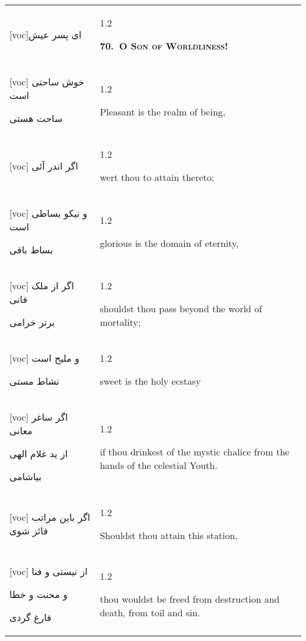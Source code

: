 \documentclass[11pt]{article}
\makeatletter
\newenvironment{orig}
  {\begin{farsi}[voc]}
  {\end{farsi}}
\newenvironment{trans}
  {\Large\begin{spacing}{1.2}\raggedright}
  {\end{spacing}}
\newenvironment{word}
  {\begin{tabular}[t]{p{2.75in}@{\hspace{3em}}p{2.875in}}}
  {\end{tabular}}
\newcommand{\ayat}[2]{\begin{orig}#1\end{orig} & \begin{trans}#2\end{trans}}
\newcommand{\heading}[2]{\textsc{\textbf{#1}} %
}
\makeatother
\begin{document}
\begin{word}
\ayat{ای پسر عيش}{\heading{70.~O Son of Worldliness!}{}} \\ \ayat{
خوش ساحتی است

ساحت هستی
}{Pleasant is the realm of being,} \\ \ayat{
اگر اندر آئی
}{wert thou to attain thereto;} \vspace{-1ex}\\ \ayat{
و نيکو بساطی است

بساط باقی
}{glorious is the domain of eternity,} \\ \ayat{
اگر از ملک فانی

برتر خرامی
}{shouldst thou pass beyond the world of mortality;} \vspace{-1ex}\\ \ayat{
و مليح است

نشاط مستی
}{sweet is the holy ecstasy} \\ \ayat{
اگر ساغر معانی

از يد غلام الهی

بياشامی
}{if thou drinkest of the mystic chalice from the hands of the celestial
  Youth.} \\ \ayat{
اگر باين مراتب فائز شوی
}{Shouldst thou attain this station,} \vspace{-1ex}\\ \ayat{
از نيستی و فنا

و محنت و خطا

فارغ گردی
}{thou wouldst be freed from destruction and death, from toil and sin.}
\end{word}

\pagebreak
\end{document}

